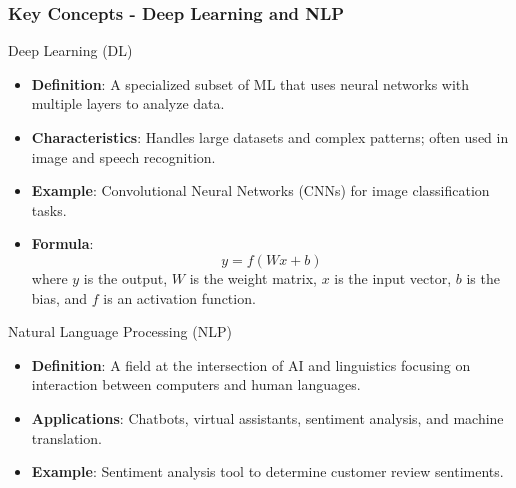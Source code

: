 \documentclass{beamer}
\begin{document}
\begin{frame}[fragile]
    \frametitle{Key Concepts - Deep Learning and NLP}
    \begin{block}{Deep Learning (DL)}
        \begin{itemize}
            \item \textbf{Definition}: A specialized subset of ML that uses neural networks with multiple layers to analyze data.
            \item \textbf{Characteristics}: Handles large datasets and complex patterns; often used in image and speech recognition.
            \item \textbf{Example}: Convolutional Neural Networks (CNNs) for image classification tasks.
            \item \textbf{Formula}:
            \begin{equation}
                y = f(Wx + b)
            \end{equation}
            where \(y\) is the output, \(W\) is the weight matrix, \(x\) is the input vector, \(b\) is the bias, and \(f\) is an activation function.
        \end{itemize}
    \end{block}
    
    \begin{block}{Natural Language Processing (NLP)}
        \begin{itemize}
            \item \textbf{Definition}: A field at the intersection of AI and linguistics focusing on interaction between computers and human languages.
            \item \textbf{Applications}: Chatbots, virtual assistants, sentiment analysis, and machine translation.
            \item \textbf{Example}: Sentiment analysis tool to determine customer review sentiments.
        \end{itemize}
    \end{block}
\end{frame}
\end{document}
